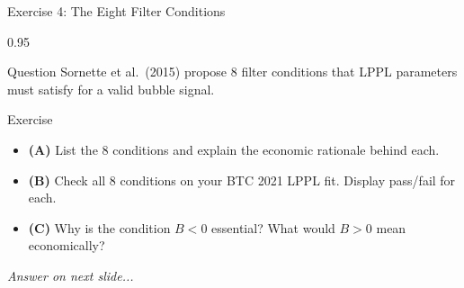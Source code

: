 \documentclass[9pt, aspectratio=169, t]{beamer}
\begin{document}
\begin{frame}{Exercise 4: The Eight Filter Conditions}
    \begin{cminipage}{0.95\textwidth}
    \begin{alertblock}{Question}
        Sornette et al.\ (2015) propose 8 filter conditions that LPPL parameters must satisfy for a valid bubble signal.
    \end{alertblock}

    \vspace{0.15cm}

    \begin{block}{Exercise}
        \begin{itemize}\setlength{\itemsep}{3pt}
            \item \textcolor{MainBlue}{\textbf{(A)}} List the 8 conditions and explain the economic rationale behind each.
            \item \textcolor{MainBlue}{\textbf{(B)}} Check all 8 conditions on your BTC 2021 LPPL fit. Display pass/fail for each.
            \item \textcolor{MainBlue}{\textbf{(C)}} Why is the condition $B < 0$ essential? What would $B > 0$ mean economically?
        \end{itemize}
    \end{block}

    \vspace{0.15cm}

    \begin{center}
        \textit{Answer on next slide...}
    \end{center}
    \end{cminipage}
\end{frame}
\end{document}
